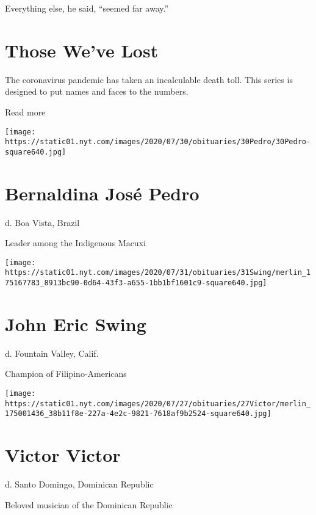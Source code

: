Everything else, he said, ``seemed far away.''

\href{https://www.nytimes.com/interactive/2020/obituaries/people-died-coronavirus-obituaries.html?action=click\&pgtype=Article\&state=default\&region=BELOW_MAIN_CONTENT\&context=covid_obits_promo}{}

\hypertarget{those-weve-lost}{%
\section{Those We've Lost}\label{those-weve-lost}}

The coronavirus pandemic has taken an incalculable death toll. This
series is designed to put names and faces to the numbers.

Read more

\texttt{[image: https://static01.nyt.com/images/2020/07/30/obituaries/30Pedro/30Pedro-square640.jpg]}

\hypertarget{bernaldina-josuxe9-pedro}{%
\section{Bernaldina José Pedro}\label{bernaldina-josuxe9-pedro}}

d. Boa Vista, Brazil

Leader among the Indigenous Macuxi

\texttt{[image: https://static01.nyt.com/images/2020/07/31/obituaries/31Swing/merlin\_175167783\_8913bc90-0d64-43f3-a655-1bb1bf1601c9-square640.jpg]}

\hypertarget{john-eric-swing}{%
\section{John Eric Swing}\label{john-eric-swing}}

d. Fountain Valley, Calif.

Champion of Filipino-Americans

\texttt{[image: https://static01.nyt.com/images/2020/07/27/obituaries/27Victor/merlin\_175001436\_38b11f8e-227a-4e2c-9821-7618af9b2524-square640.jpg]}

\hypertarget{victor-victor}{%
\section{Victor Victor}\label{victor-victor}}

d. Santo Domingo, Dominican Republic

Beloved musician of the Dominican Republic

